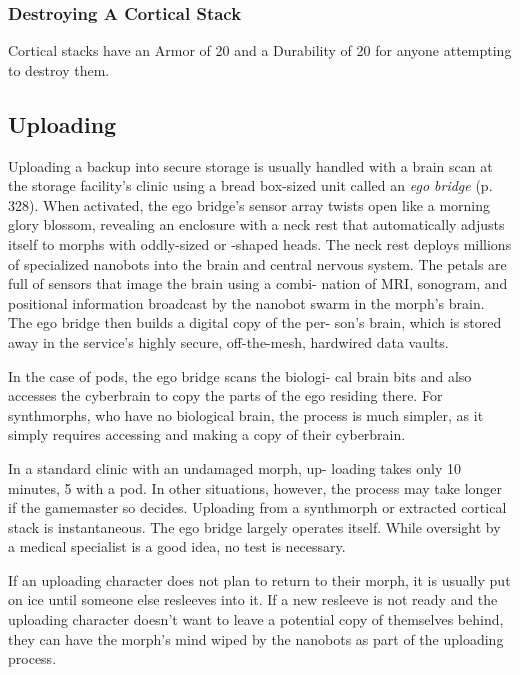 \subsubsection{Destroying A Cortical Stack}

Cortical stacks have an Armor of 20 and a Durability 
of 20 for anyone attempting to destroy them.

\subsection{Uploading}

Uploading a backup into secure storage is usually 
handled with a brain scan at the storage facility's clinic 
using a bread box-sized unit called an \textit{ego bridge} (p. 
328). When activated, the ego bridge's sensor array 
twists open like a morning glory blossom, revealing an 
enclosure with a neck rest that automatically adjusts 
itself to morphs with oddly-sized or -shaped heads. 
The neck rest deploys millions of specialized nanobots 
into the brain and central nervous system. The petals 
are full of sensors that image the brain using a combi-
nation of MRI, sonogram, and positional information 
broadcast by the nanobot swarm in the morph's brain. 
The ego bridge then builds a digital copy of the per-
son's brain, which is stored away in the service's highly 
secure, off-the-mesh, hardwired data vaults.

In the case of pods, the ego bridge scans the biologi-
cal brain bits and also accesses the cyberbrain to copy 
the parts of the ego residing there. For synthmorphs, 
who have no biological brain, the process is much 
simpler, as it simply requires accessing and making a 
copy of their cyberbrain.

In a standard clinic with an undamaged morph, up-
loading takes only 10 minutes, 5 with a pod. In other 
situations, however, the process may take longer if the 
gamemaster so decides. Uploading from a synthmorph 
or extracted cortical stack is instantaneous. The ego 
bridge largely operates itself. While oversight by a 
medical specialist is a good idea, no test is necessary.

If an uploading character does not plan to return 
to their morph, it is usually put on ice until someone 
else resleeves into it. If a new resleeve is not ready 
and the uploading character doesn't want to leave a 
potential copy of themselves behind, they can have 
the morph's mind wiped by the nanobots as part of 
the uploading process.

